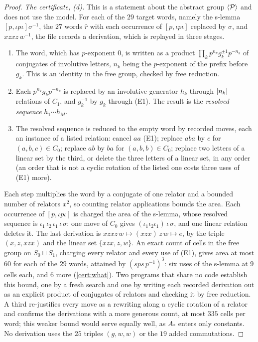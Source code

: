 \begin{proof}
\emph{The certificate, (d).} This is a statement about the abstract group $\langle\mathcal P\rangle$ and does not use the model. For each of the
$29$ target words, namely the s-lemma $[p,\iota p\iota]\sigma^{-1}$, the $27$ words $\hat r$ with each occurrence of $[p,\iota p\iota]$
replaced by $\sigma$, and $xzxz\,w^{-1}$, the file records a derivation, which is replayed in three stages.
\begin{enumerate}[label=(\roman*),itemsep=0pt]
\item The word, which has $p$-exponent $0$, is written as a product $\prod_kp^{n_k}g_k^{\pm1}p^{-n_k}$ of conjugates of involutive letters,
$n_k$ being the $p$-exponent of the prefix before $g_k$. This is an identity in the free group, checked by free reduction.
\item Each $p^{n_k}g_kp^{-n_k}$ is replaced by an involutive generator $h_k$ through $\lvert n_k\rvert$ relations of $C_1$, and $g_k^{-1}$ by $g_k$
through (E1). The result is the \emph{resolved sequence} $h_1\cdots h_M$.
\item The resolved sequence is reduced to the empty word by recorded moves, each an instance of a listed relation: cancel $aa$ (E1);
replace $aba$ by $c$ for $(a,b,c)\in C_0$; replace $ab$ by $ba$ for $(a,b,b)\in C_0$; replace two letters of a linear set by the third, or
delete the three letters of a linear set, in any order (an order that is not a cyclic rotation of the listed one costs three uses of (E1)
more).
\end{enumerate}
Each step multiplies the word by a conjugate of one relator and a bounded number of relators $x^2$, so counting relator applications bounds
the area. Each occurrence of $[p,\iota p\iota]$ is charged the area of the s-lemma, whose resolved sequence is
$\iota_1\,\iota_2\,\iota_1\,\iota\,\sigma$: one move of $C_0$ gives $(\iota_1\iota_2\iota_1)\,\iota\,\sigma$, and one linear relation deletes
it. The last derivation is $xzxz\,w\mapsto(xzx)\,z\,w\mapsto e$, by the triple $(x,z,xzx)$ and the linear set $\{xzx,z,w\}$. An exact count
of cells in the free group on $S_0\sqcup S_1$, charging every relator and every use of (E1), gives area at most $60$ for each of the $29$
words, attained by $(sps\,p^{-1})^3$: six uses of the s-lemma at $9$ cells each, and $6$ more (\cref{cert:what}). Two programs that share
no code establish this bound, one by a fresh search and one by writing each recorded derivation out as an explicit product of conjugates of
relators and checking it by free reduction. A third re-justifies every move as a rewriting along a cyclic rotation of a relator and
confirms the derivations with a more generous count, at most $335$ cells per word; this weaker bound would serve equally well, as $A_*$
enters only constants. No derivation uses the $25$
triples $(g,w,w)$ or the $19$ added commutations.
\end{proof}

